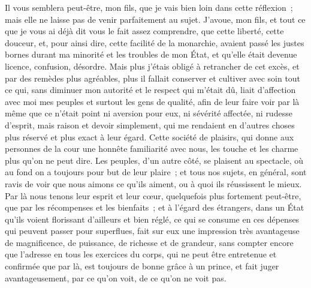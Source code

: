 \documentclass[french,twoside]{book} %
\begin{document}
Il vous semblera peut-être, mon fils, que je vais bien loin dans cette réflexion ; mais elle ne laisse pas de venir parfaitement au sujet. J’avoue, mon fils, et tout ce que je vous ai déjà dit vous le fait assez comprendre, que cette liberté, cette douceur, et, pour ainsi dire, cette facilité de la monarchie, avaient passé les justes bornes durant ma minorité et les troubles de mon État, et qu’elle était devenue licence, confusion, désordre. Mais plus j’étais obligé à retrancher de cet excès, et par des remèdes plus agréables, plus il fallait conserver et cultiver avec soin tout ce qui, sans diminuer mon autorité et le respect qui m’était dû, liait d’affection avec moi mes peuples et surtout les gens de qualité, afin de leur faire voir par là même que ce n’était point ni aversion pour eux, ni sévérité affectée, ni rudesse d’esprit, mais raison et devoir simplement, qui me rendaient en d’autres choses plus réservé et plus exact à leur égard. Cette société de plaisirs, qui donne aux personnes de la cour une honnête familiarité avec nous, les touche et les charme plus qu’on ne peut dire. Les peuples, d’un autre côté, se plaisent au spectacle, où au fond on a toujours pour but de leur plaire ; et tous nos sujets, en général, sont ravis de voir que nous aimons ce qu’ils aiment, ou à quoi ils réussissent le mieux. Par là nous tenons leur esprit et leur cœur, quelquefois plus fortement peut-être, que par les récompenses et les bienfaits ; et à l’égard des étrangers, dans un État qu’ils voient florissant d’ailleurs et bien réglé, ce qui se consume en ces dépenses qui peuvent passer pour superflues, fait sur eux une impression très avantageuse de magnificence, de puissance, de richesse et de grandeur, sans compter encore que l’adresse en tous les exercices du corps, qui ne peut être entretenue et confirmée que par là, est toujours de bonne grâce à un prince, et fait juger avantageusement, par ce qu’on voit, de ce qu’on ne voit pas.\par
\end{document}
